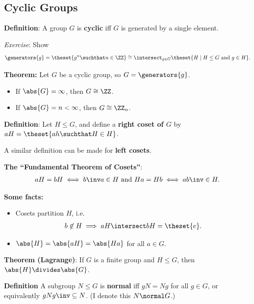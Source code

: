 \hypertarget{cyclic-groups}{%
\subsection{Cyclic Groups}\label{cyclic-groups}}

\textbf{Definition}: A group \(G\) is \textbf{cyclic} iff \(G\) is
generated by a single element.

\emph{Exercise}: Show
\begin{align*}
\generators{g} = \theset{g^n \suchthat n\in\ZZ} \cong \intersect_{g\in G} \theset{H \mid H \leq G \text{ and } g\in H}
.\end{align*}

\textbf{Theorem:} Let \(G\) be a cyclic group, so
\(G = \generators{g}\).

\begin{itemize}
\item
  If \(\abs{G} = \infty\), then \(G \cong \ZZ\).
\item
  If \(\abs{G} = n < \infty\), then \(G \cong \ZZ_n\).
\end{itemize}

\textbf{Definition}: Let \(H \leq G\), and define a \textbf{right coset
of \(G\)} by \(aH = \theset{ah \suchthat H \in H}\).

A similar definition can be made for \textbf{left cosets}.

\textbf{The ``Fundamental Theorem of Cosets''}:
\begin{align*}
aH = bH \iff b\inv a \in H \text{ and } Ha = Hb \iff ab\inv \in H
.\end{align*}

\textbf{Some facts:}

\begin{itemize}
\item
  Cosets partition \(H\), i.e.
  \begin{align*}
  b\not\in H \implies aH \intersect bH = \theset{e}
  .\end{align*}
\item
  \(\abs{H} = \abs{aH} = \abs{Ha}\) for all \(a\in G\).
\end{itemize}

\textbf{Theorem (Lagrange)}: If \(G\) is a finite group and
\(H \leq G\), then \(\abs{H} \divides \abs{G}\).

\textbf{Definition} A subgroup \(N \leq G\) is \textbf{normal} iff
\(gN = Ng\) for all \(g\in G\), or equivalently \(gNg\inv \subseteq N\).
(I denote this \(N \normal G\).)

